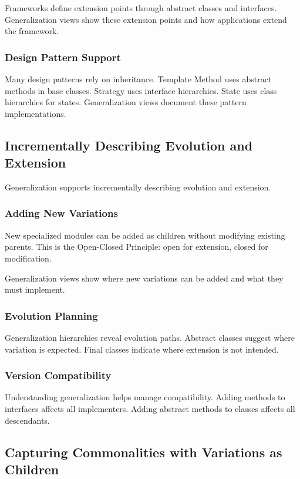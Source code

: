 \documentclass[11pt]{article}
\begin{document}
Frameworks define extension points through abstract classes and interfaces. Generalization views show these extension points and how applications extend the framework.

\subsubsection{Design Pattern Support}

Many design patterns rely on inheritance. Template Method uses abstract methods in base classes. Strategy uses interface hierarchies. State uses class hierarchies for states. Generalization views document these pattern implementations.

\subsection{Incrementally Describing Evolution and Extension}

Generalization supports incrementally describing evolution and extension.

\subsubsection{Adding New Variations}

New specialized modules can be added as children without modifying existing parents. This is the Open-Closed Principle: open for extension, closed for modification.

Generalization views show where new variations can be added and what they must implement.

\subsubsection{Evolution Planning}

Generalization hierarchies reveal evolution paths. Abstract classes suggest where variation is expected. Final classes indicate where extension is not intended.

\subsubsection{Version Compatibility}

Understanding generalization helps manage compatibility. Adding methods to interfaces affects all implementers. Adding abstract methods to classes affects all descendants.

\subsection{Capturing Commonalities with Variations as Children}
\end{document}
